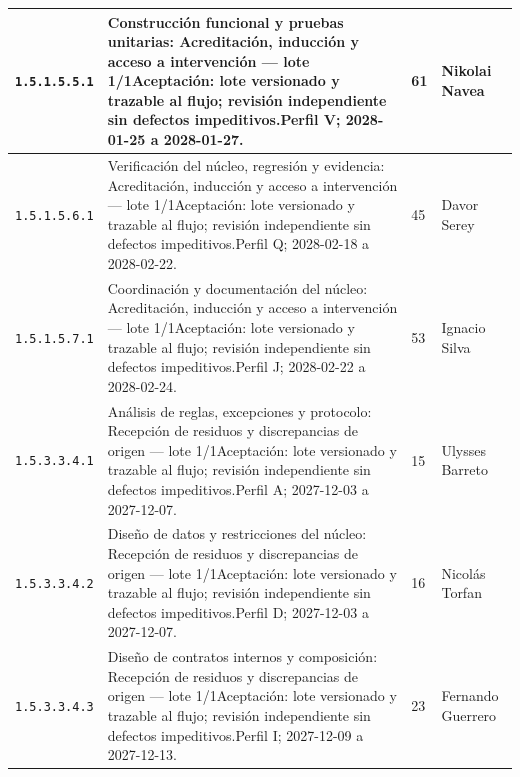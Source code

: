\begin{longtable}{L{29mm}L{80mm}R{12mm}L{28mm}}
\texttt{1.\allowbreak{}5.\allowbreak{}1.\allowbreak{}5.\allowbreak{}5.\allowbreak{}1} & Construcción funcional y pruebas unitarias: Acreditación, inducción y acceso a intervención — lote 1/1\newline Aceptación: lote versionado y trazable al flujo; revisión independiente sin defectos impeditivos.\newline Perfil V; 2028-01-25 a 2028-01-27. & 61 & Nikolai Navea\\\hline
\texttt{1.\allowbreak{}5.\allowbreak{}1.\allowbreak{}5.\allowbreak{}6.\allowbreak{}1} & Verificación del núcleo, regresión y evidencia: Acreditación, inducción y acceso a intervención — lote 1/1\newline Aceptación: lote versionado y trazable al flujo; revisión independiente sin defectos impeditivos.\newline Perfil Q; 2028-02-18 a 2028-02-22. & 45 & Davor Serey\\\hline
\texttt{1.\allowbreak{}5.\allowbreak{}1.\allowbreak{}5.\allowbreak{}7.\allowbreak{}1} & Coordinación y documentación del núcleo: Acreditación, inducción y acceso a intervención — lote 1/1\newline Aceptación: lote versionado y trazable al flujo; revisión independiente sin defectos impeditivos.\newline Perfil J; 2028-02-22 a 2028-02-24. & 53 & Ignacio Silva\\\hline
\texttt{1.\allowbreak{}5.\allowbreak{}3.\allowbreak{}3.\allowbreak{}4.\allowbreak{}1} & Análisis de reglas, excepciones y protocolo: Recepción de residuos y discrepancias de origen — lote 1/1\newline Aceptación: lote versionado y trazable al flujo; revisión independiente sin defectos impeditivos.\newline Perfil A; 2027-12-03 a 2027-12-07. & 15 & Ulysses Barreto\\\hline
\texttt{1.\allowbreak{}5.\allowbreak{}3.\allowbreak{}3.\allowbreak{}4.\allowbreak{}2} & Diseño de datos y restricciones del núcleo: Recepción de residuos y discrepancias de origen — lote 1/1\newline Aceptación: lote versionado y trazable al flujo; revisión independiente sin defectos impeditivos.\newline Perfil D; 2027-12-03 a 2027-12-07. & 16 & Nicolás Torfan\\\hline
\texttt{1.\allowbreak{}5.\allowbreak{}3.\allowbreak{}3.\allowbreak{}4.\allowbreak{}3} & Diseño de contratos internos y composición: Recepción de residuos y discrepancias de origen — lote 1/1\newline Aceptación: lote versionado y trazable al flujo; revisión independiente sin defectos impeditivos.\newline Perfil I; 2027-12-09 a 2027-12-13. & 23 & Fernando Guerrero\\\hline

\end{longtable}
